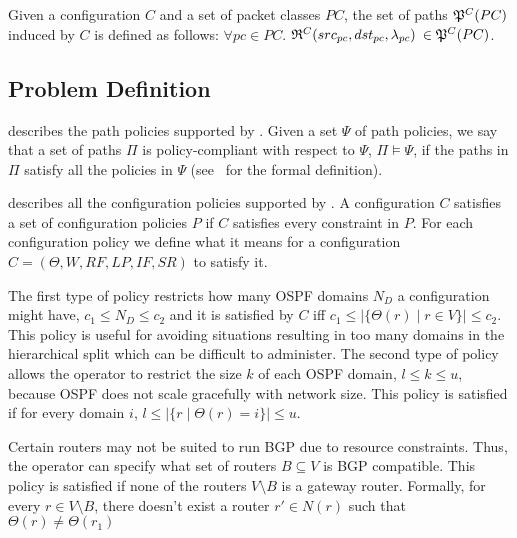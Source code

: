 \begin{definition}
Given a configuration $C$ and a set of packet classes $PC$, the set of paths
$\mathfrak{P}^C(PC)$ induced by $C$ is defined as follows: 
$\forall pc \in PC.$ $\mathfrak{R}^C(src_{pc}, dst_{pc}, \lambda_{pc})$ $\in \mathfrak{P}^C(PC)$.
\end{definition}

\subsection{Problem Definition}



 describes the path policies supported by \name.
Given  a set $\Psi$ of
path policies, we say that
a set of paths $\Pi$ is policy-compliant with respect to $\Psi$, $\Pi \models \Psi$,
if the paths in $\Pi$ satisfy all the policies in $\Psi$ (see~\cite{genesis} for the formal definition). 


 describes all the configuration policies supported by \name.
A configuration $C$ satisfies a set of configuration policies $P$
if $C$ satisfies every constraint in $P$.
For each configuration policy 
we define what it means for  a configuration $C=(\Theta,W,RF,LP,IF,SR)$ to satisfy it.

The first type of policy restricts how many OSPF domains $N_D$ a
configuration might have, $c_1\leq N_D\leq c_2$ 
and it is satisfied by $C$ iff $c_1\leq |\{\Theta(r)\mid r\in V\}|\leq
c_2$.  This policy is useful for avoiding situations resulting in too
many domains in the hierarchical split which can be difficult to
administer.  The second type of policy allows the operator to restrict
the size $k$ of each OSPF domain, $l\leq k\leq u$, because OSPF does
not scale gracefully with network size.  This policy is satisfied if
for every domain $i$, $l\leq |\{r \mid \Theta(r)=i\}|\leq u$.


Certain 
	routers may not be suited to run BGP due to resource
	constraints. Thus, the operator can specify what set of 
	routers $B\subseteq V$ is BGP compatible.  
	This policy is satisfied if none of the routers $V\setminus B$
	is a gateway router.
	Formally, for every $r\in V\setminus B$,
	there doesn't exist a router $r'\in N(r)$ such that $\Theta(r) \not= \Theta(r_1)$

